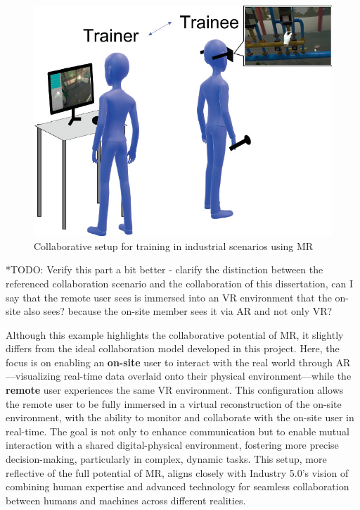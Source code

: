     \begin{figure}[h]
        \centering
        \includegraphics[width=0.7\linewidth]{figs/mr-example-collab.png}
        \caption{Collaborative setup for training in industrial scenarios using \ac{MR} \cite{Mayer2023}}
        \label{f:mr-collab-example}
    \end{figure}

    *TODO: Verify this part a bit better - clarify the distinction between the referenced collaboration scenario and the collaboration of this dissertation, can I say that the remote user sees is immersed into an VR environment that the on-site also sees? because the on-site member sees it via AR and not only VR? 
    
    Although this example highlights the collaborative potential of \ac{MR}, it slightly differs from the ideal collaboration model developed in this project. Here, the focus is on enabling an \textbf{on-site} user to interact with the real world through \ac{AR}—visualizing real-time data overlaid onto their physical environment—while the \textbf{remote} user experiences the same \ac{VR} environment. This configuration allows the remote user to be fully immersed in a virtual reconstruction of the on-site environment, with the ability to monitor and collaborate with the on-site user in real-time. The goal is not only to enhance communication but to enable mutual interaction with a shared digital-physical environment, fostering more precise decision-making, particularly in complex, dynamic tasks. This setup, more reflective of the full potential of \ac{MR}, aligns closely with Industry 5.0’s vision of combining human expertise and advanced technology for seamless collaboration between humans and machines across different realities.




